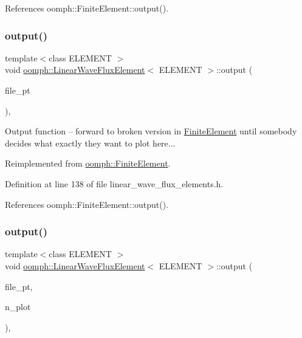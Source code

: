 References oomph\+::\+Finite\+Element\+::output().

\mbox{\label{classoomph_1_1LinearWaveFluxElement_a8c857d40393967eb1e88314ba9efc729}} 
\subsubsection{\texorpdfstring{output()}{output()}\hspace{0.1cm}{\footnotesize\ttfamily [3/4]}}
{\footnotesize\ttfamily template$<$class E\+L\+E\+M\+E\+NT $>$ \\
void \hyperlink{classoomph_1_1LinearWaveFluxElement}{oomph\+::\+Linear\+Wave\+Flux\+Element}$<$ E\+L\+E\+M\+E\+NT $>$\+::output (\begin{DoxyParamCaption}\item[{F\+I\+LE $\ast$}]{file\+\_\+pt }\end{DoxyParamCaption})\hspace{0.3cm}{\ttfamily [inline]}, {\ttfamily [virtual]}}

Output function -- forward to broken version in \hyperlink{classoomph_1_1FiniteElement}{Finite\+Element} until somebody decides what exactly they want to plot here... 

Reimplemented from \hyperlink{classoomph_1_1FiniteElement_a72cddd09f8ddbee1a20a1ff404c6943e}{oomph\+::\+Finite\+Element}.



Definition at line 138 of file linear\+\_\+wave\+\_\+flux\+\_\+elements.\+h.



References oomph\+::\+Finite\+Element\+::output().

\mbox{\label{classoomph_1_1LinearWaveFluxElement_a09230e7c17c744a62ed8d3e317ba1eeb}} 
\subsubsection{\texorpdfstring{output()}{output()}\hspace{0.1cm}{\footnotesize\ttfamily [4/4]}}
{\footnotesize\ttfamily template$<$class E\+L\+E\+M\+E\+NT $>$ \\
void \hyperlink{classoomph_1_1LinearWaveFluxElement}{oomph\+::\+Linear\+Wave\+Flux\+Element}$<$ E\+L\+E\+M\+E\+NT $>$\+::output (\begin{DoxyParamCaption}\item[{F\+I\+LE $\ast$}]{file\+\_\+pt,  }\item[{const unsigned \&}]{n\+\_\+plot }\end{DoxyParamCaption})\hspace{0.3cm}{\ttfamily [inline]}, {\ttfamily [virtual]}}



